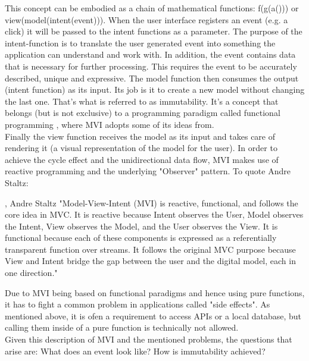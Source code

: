 This concept can be embodied as a chain of mathematical functions: f(g(a())) or view(model(intent(event))).
When the user interface registers an event (e.g. a click) it will be passed to the intent functions as a parameter. 
The purpose of the intent-function is to translate the user generated event into something the application can understand and work with.
In addition, the event contains data that is necessary for further processing. This requires the event to be accurately described, unique and expressive.
The model function then consumes the output (intent function) as its input. Its job is it to create a new model without changing the last one. 
That's what is referred to as immutability. 
\cite{immutabilityEffectiveJavaJoshuaBloch2017,immutabilityImmutableObjectsInJavaChristianHaack2006}
It's a concept that belongs (but is not exclusive) to a programming paradigm called functional programming
\cite{functionalProgrammingFunctionalProgrammingInJavaPierreYves2017},
where MVI adopts some of its ideas from.
\\
Finally the view function receives the model as its input and takes care of rendering it (a visual representation of the model for the user). 
In order to achieve the cycle effect and the unidirectional data flow, MVI makes use of reactive programming 
\cite{reactiveProgrammingReactiveProgrammingWithJavaBenChristensen,reactiveProgrammingTheIntroductionToReactiveAndreStaltz} 
and the underlying "Observer" pattern.
To quote Andre Staltz:
\begin{pquotation}{\cite{citationMVIAndreStaltz}, Andre Staltz}
    "Model-View-Intent (MVI) is reactive, functional, and follows the core idea in MVC. It is reactive because Intent observes the User, Model observes the Intent, 
    View observes the Model, and the User observes the View. It is functional because each of these components is expressed as a referentially transparent function 
    over streams. It follows the original MVC purpose because View and Intent bridge the gap between the user and the digital model, each in one direction."
\end{pquotation}
Due to MVI being based on functional paradigms and hence using pure functions, it has to fight a common problem in applications called "side effects".
As mentioned above, it is ofen a requirement to access APIs or a local database, but calling them inside of a pure function is technically not allowed.
\\
Given this description of MVI and the mentioned problems, the questions that arise are: What does an event look like? How is immutability achieved?

